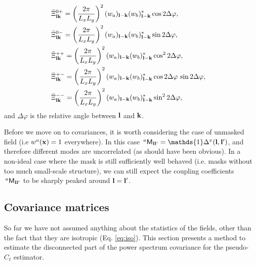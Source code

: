 \documentclass[a4paper,11pt]{article}
\begin{document}
\begin{itemize}
\begin{align}
          &\bar{\Xi}^{0+}_{{\bf l}{\bf k}}=\left(\frac{2\pi}{L_xL_y}\right)^2 (w_a)_{{\bf l}-{\bf k}}(w_b)^*_{{\bf l}-{\bf k}}\cos2\Delta\varphi,\\
          &\bar{\Xi}^{0-}_{{\bf l}{\bf k}}=\left(\frac{2\pi}{L_xL_y}\right)^2 (w_a)_{{\bf l}-{\bf k}}(w_b)^*_{{\bf l}-{\bf k}}\sin2\Delta\varphi,\\
          &\bar{\Xi}^{++}_{{\bf l}{\bf k}}=\left(\frac{2\pi}{L_xL_y}\right)^2 (w_a)_{{\bf l}-{\bf k}}(w_b)^*_{{\bf l}-{\bf k}}\cos^22\Delta\varphi,\\
          &\bar{\Xi}^{+-}_{{\bf l}{\bf k}}=\left(\frac{2\pi}{L_xL_y}\right)^2 (w_a)_{{\bf l}-{\bf k}}(w_b)^*_{{\bf l}-{\bf k}}\cos2\Delta\varphi\,\sin2\Delta\varphi,\\
          &\bar{\Xi}^{--}_{{\bf l}{\bf k}}=\left(\frac{2\pi}{L_xL_y}\right)^2 (w_a)_{{\bf l}-{\bf k}}(w_b)^*_{{\bf l}-{\bf k}}\sin^22\Delta\varphi,
        \end{align}
        and $\Delta\varphi$ is the relative angle between ${\bf l}$ and ${\bf k}$.
      \end{itemize}

      Before we move on to covariances, it is worth considering the case of
      unmasked field (i.e $w^a({\bf x})=1$ everywhere). In this case $\,^a{\sf
        M}_{{\bf l}{\bf l}'}=\mathds{1}\Delta^x({\bf l},{\bf l}')$, and therefore different modes are uncorrelated (as should have been obvious). In a non-ideal case where the mask is still sufficiently well behaved (i.e. masks without too much small-scale structure), we can still expect the coupling coefficients $\,^a{\sf M}_{{\bf l}{\bf l}'}$ to be sharply peaked around ${\bf l}={\bf l}'$.
  
    \subsection{Covariance matrices}\label{ssec:theory.pclcov}
      So far we have not assumed anything about the statistics of the fields, other than the fact that they are isotropic (Eq. \ref{eq:iso}). This section presents a method to estimate the disconnected part of the power spectrum covariance for the pseudo-$C_\ell$ estimator.
    
\end{document}
